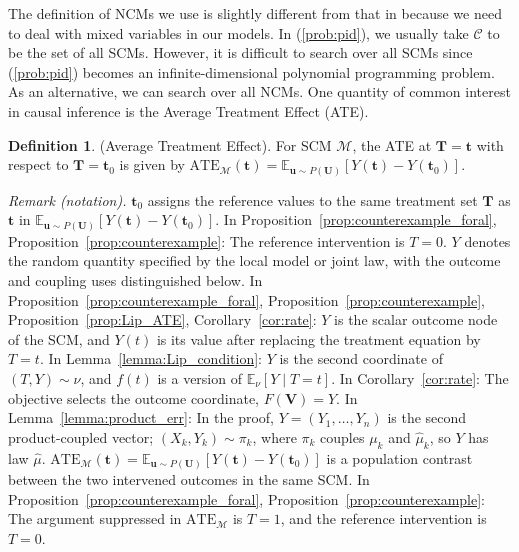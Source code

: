 \documentclass[12pt]{article}
\theoremstyle{plain}
\theoremstyle{definition}
\newtheorem{definition}[theorem]{Definition}
\theoremstyle{remark}
\begin{document}
The definition of NCMs we use is slightly different from that in 
\cite{xia2022neural} because we need to deal with mixed variables in our models.  In (\ref{prob:pid}), we usually take $\mathcal{C}$ to be the set of all SCMs. However, it is difficult to search over all SCMs since (\ref{prob:pid}) becomes an infinite-dimensional polynomial programming problem. As an alternative, we can search over all NCMs. One quantity of common interest in causal inference is the Average Treatment Effect (ATE).
\begin{definition}
(Average Treatment Effect). For SCM $ \mathcal{M}$, the ATE at $ \boldsymbol{T}=\boldsymbol{t}$ with respect to $ \boldsymbol{T}=\boldsymbol{t}_0$ is given by $\text{ATE}_{\mathcal{M}}(\boldsymbol{t}) =\mathbb{E}_{\boldsymbol{u} \sim P(\boldsymbol{U})}[ Y({\boldsymbol{t}}) -Y({\boldsymbol{t}}_{0})]$.
\end{definition}

\noindent\textit{Remark (notation).} $\boldsymbol{t}_0$ assigns the reference values to the same treatment set $\boldsymbol{T}$ as $\boldsymbol{t}$ in $\mathbb{E}_{\boldsymbol{u}\sim P(\boldsymbol{U})}[Y(\boldsymbol{t})-Y(\boldsymbol{t}_0)]$. In Proposition~\ref{prop:counterexample_foral}, Proposition~\ref{prop:counterexample}: The reference intervention is $T=0$. $Y$ denotes the random quantity specified by the local model or joint law, with the outcome and coupling uses distinguished below. In Proposition~\ref{prop:counterexample_foral}, Proposition~\ref{prop:counterexample}, Proposition~\ref{prop:Lip_ATE}, Corollary~\ref{cor:rate}: $Y$ is the scalar outcome node of the SCM, and $Y(t)$ is its value after replacing the treatment equation by $T=t$. In Lemma~\ref{lemma:Lip_condition}: $Y$ is the second coordinate of $(T,Y)\sim\nu$, and $f(t)$ is a version of $\mathbb{E}_{\nu}[Y\mid T=t]$. In Corollary~\ref{cor:rate}: The objective selects the outcome coordinate, $F(\boldsymbol{V})=Y$. In Lemma~\ref{lemma:product_err}: In the proof, $Y=(Y_1,\ldots,Y_n)$ is the second product-coupled vector; $(X_k,Y_k)\sim\pi_k$, where $\pi_k$ couples $\mu_k$ and $\hat{\mu}_k$, so $Y$ has law $\hat{\mu}$. $\text{ATE}_{\mathcal{M}}(\boldsymbol{t})=\mathbb{E}_{\boldsymbol{u}\sim P(\boldsymbol{U})}[Y(\boldsymbol{t})-Y(\boldsymbol{t}_0)]$ is a population contrast between the two intervened outcomes in the same SCM. In Proposition~\ref{prop:counterexample_foral}, Proposition~\ref{prop:counterexample}: The argument suppressed in $\text{ATE}_{\mathcal{M}}$ is $T=1$, and the reference intervention is $T=0$.
\end{document}
